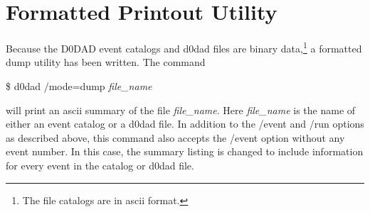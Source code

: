 \section{Formatted Printout Utility\label{ss-ug-utils}}
\par
Because the D0DAD event catalogs and d0dad files are binary data,\footnote{The 
file catalogs are in ascii format.}
a formatted dump utility has been written.  The command
\begin{center}
 \$ d0dad /mode=dump {\em file\_name}
\end{center}
will print an ascii summary of the file {\em file\_name}.  Here 
{\em file\_name} is the name of either an event catalog or a d0dad file.  
In addition to the /event and /run options as
described above, this command also accepts 
the /event option without any event number.
In this case, the summary listing is changed to include information for every
event in the catalog or d0dad file.








